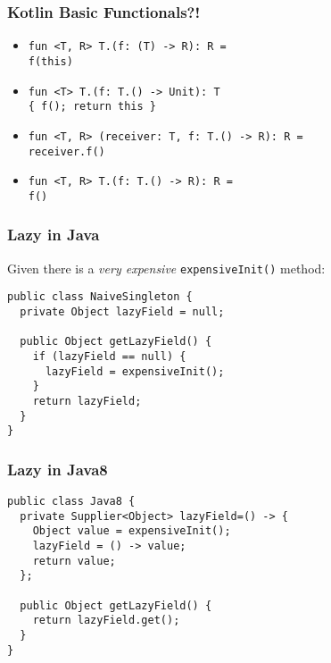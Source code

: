 
	
\begin{frame}[fragile] \frametitle{Kotlin Basic Functionals?!}
\begin{itemize}
	\setlength\itemsep{1.5em}
	\item \texttt{fun <T, R> T.(f: (T) -> R): R = \\ f(this)}
	\item \texttt{fun <T> T.(f: T.() -> Unit): T \\ \{ f(); return this \}}
	\item \texttt{fun <T, R> (receiver: T, f: T.() -> R): R = \\ receiver.f()}
	\item \texttt{fun <T, R> T.(f: T.() -> R): R = \\ f()}
\end{itemize}
\end{frame}



\begin{frame}[fragile] \frametitle{Lazy in Java}
Given there is a \textit{very expensive} \texttt{expensiveInit()} method:
\pause
\begin{lstlisting}
public class NaiveSingleton {
  private Object lazyField = null;

  public Object getLazyField() {
    if (lazyField == null) {
      lazyField = expensiveInit();
    }
    return lazyField;
  }
}
\end{lstlisting}
\end{frame}

\begin{frame}[fragile] \frametitle{Lazy in Java8}
\begin{lstlisting}
public class Java8 {
  private Supplier<Object> lazyField=() -> {
    Object value = expensiveInit();
    lazyField = () -> value;
    return value;
  };

  public Object getLazyField() {
    return lazyField.get();
  }
}
\end{lstlisting}
\end{frame}

